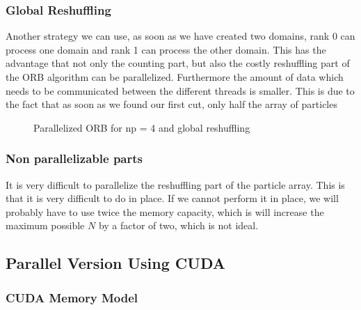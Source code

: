 \documentclass[]{article}
\begin{document}
\subsubsection{Global Reshuffling}

Another strategy we can use, as soon as we have created two domains, rank 0 can process one domain and rank 1 can process the other domain. This has the advantage that not only the counting part, but also the costly reshuffling part of the ORB algorithm can be parallelized. Furthermore the amount of data which needs to be communicated between the different threads is smaller. This is due to the fact that as soon as we found our first cut, only half the array of particles 


\begin{figure}[H]
	\begin{center}
	\end{center}
	\caption{Parallelized ORB for np = 4 and global reshuffling}
	\label{fig:orb_parallel}
\end{figure}


\vspace{5mm}

\subsubsection{Non parallelizable parts}
It is very difficult to parallelize the reshuffling part of the particle array. This is that it is very difficult to do in place. If we cannot perform it in place, we will probably have to use twice the memory capacity, which is will increase the maximum possible $N$ by a factor of two, which is not ideal.


\subsection{Parallel Version Using CUDA }

\subsubsection{CUDA Memory Model}





\end{document}
